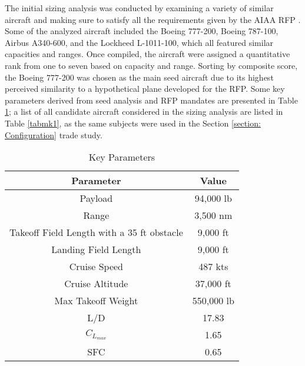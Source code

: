 The initial sizing analysis was conducted by examining a variety of similar aircraft and making sure to satisfy all the requirements given by the AIAA RFP \cite{RFP}. Some of the analyzed aircraft included the Boeing 777-200, Boeing 787-100, Airbus A340-600, and the Lockheed L-1011-100, which all featured similar capacities and ranges.  Once compiled, the aircraft were assigned a quantitative rank from one to seven based on  capacity and range. Sorting by composite score, the Boeing 777-200 was chosen as the main seed aircraft due to its highest perceived similarity to a hypothetical plane developed for the RFP.  Some key parameters derived from seed analysis and RFP mandates are presented in Table \ref{tab:req}; a list of all candidate aircraft considered in the sizing analysis are listed in Table \ref{tabmk1}, as the same subjects were used in the Section \ref{section: Configuration} trade study.

\begin{table}[h!] 
    \centering
    \caption{Key Parameters}
    \begin{tabular}{ |c||c| }\toprule
    \textbf{Parameter} & \textbf{Value} \\\hline\hline
    Payload & 94,000 lb  \\\hline
    Range & 3,500 nm \\\hline
    Takeoff Field Length with a 35 ft obstacle & 9,000 ft  \\\hline
    Landing Field Length & 9,000 ft \\\hline
    Cruise Speed & 487 kts\\\hline
    Cruise Altitude & 37,000 ft \\\hline
    Max Takeoff Weight & 550,000 lb\\\hline 
    L/D & 17.83\\\hline 
    $C_{L_{max}}$ & 1.65\\\hline 
    SFC & 0.65\\\hline 

    \end{tabular}\label{tab:req}
\end{table}

